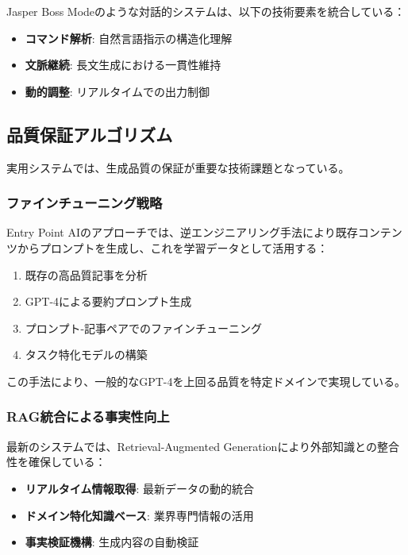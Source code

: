 \documentclass[11pt, a4paper]{article}
\begin{document}
Jasper Boss Modeのような対話的システムは、以下の技術要素を統合している：

\begin{itemize}[noitemsep,topsep=0pt]
    \item \textbf{コマンド解析}: 自然言語指示の構造化理解
    \item \textbf{文脈継続}: 長文生成における一貫性維持
    \item \textbf{動的調整}: リアルタイムでの出力制御
\end{itemize}

\subsection{品質保証アルゴリズム}

実用システムでは、生成品質の保証が重要な技術課題となっている。

\subsubsection{ファインチューニング戦略}

Entry Point AIのアプローチでは、逆エンジニアリング手法により既存コンテンツからプロンプトを生成し、これを学習データとして活用する：

\begin{enumerate}[noitemsep,topsep=0pt]
    \item 既存の高品質記事を分析
    \item GPT-4による要約プロンプト生成
    \item プロンプト-記事ペアでのファインチューニング
    \item タスク特化モデルの構築
\end{enumerate}

この手法により、一般的なGPT-4を上回る品質を特定ドメインで実現している。

\subsubsection{RAG統合による事実性向上}

最新のシステムでは、Retrieval-Augmented Generationにより外部知識との整合性を確保している：

\begin{itemize}[noitemsep,topsep=0pt]
    \item \textbf{リアルタイム情報取得}: 最新データの動的統合
    \item \textbf{ドメイン特化知識ベース}: 業界専門情報の活用
    \item \textbf{事実検証機構}: 生成内容の自動検証
\end{itemize}
\end{document}
